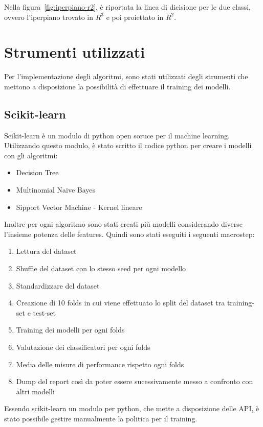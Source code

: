 \documentclass[oneside]{book}
\begin{document}
\noindent
Nella figura~\ref{fig:iperpiano-r2}, è riportata la linea di dicisione per le due classi, ovvero l'iperpiano trovato in $R^3$ e poi proiettato in $R^2$.

\section{Strumenti utilizzati}
Per l'implementazione degli algoritmi, sono stati utilizzati degli strumenti che mettono a disposizione la possibilità di effettuare il training dei modelli.

\subsection{Scikit-learn}
Scikit-learn\cite{scikit-learn} è un modulo di python open soruce per il machine learning. Utilizzando questo modulo, è stato scritto il codice python per creare i modelli con gli algoritmi:
\begin{itemize}
	\item Decision Tree
	\item Multinomial Naive Bayes
	\item Sipport Vector Machine - Kernel lineare
	
\end{itemize}
Inoltre per ogni algoritmo sono stati creati più modelli considerando diverse l'insieme potenza delle features. Quindi sono stati eseguiti i seguenti macrostep:
\begin{enumerate}
	\item Lettura del dataset
	\item Shuffle del dataset con lo stesso seed per ogni modello
	\item Standardizzare del dataset
	\item Creazione di 10 folds in cui viene effettuato lo split del dataset tra training-set e test-set
	\item Training dei modelli per ogni folds
	\item Valutazione dei classificatori per ogni folds
	\item Media delle misure di performance rispetto ogni folds
	\item Dump del report così da poter essere sucessivamente messo a confronto con altri modelli
\end{enumerate}
Essendo scikit-learn un modulo per python, che mette a disposizione delle API, è stato possibile gestire manualmente la politica per il training.
\end{document}
